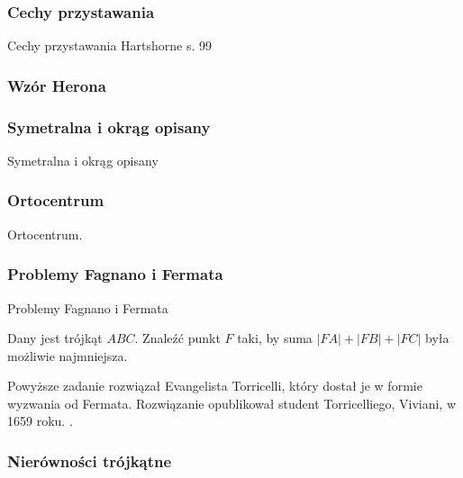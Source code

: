 
\subsubsection{Cechy przystawania}
Cechy przystawania
\loremipsum
Hartshorne s. 99







\subsubsection{Wzór Herona}


\subsubsection{Symetralna i okrąg opisany}
Symetralna i okrąg opisany
\loremipsum

\subsubsection{Ortocentrum}
Ortocentrum.
\loremipsum

\subsubsection{Problemy Fagnano i Fermata}
Problemy Fagnano i Fermata

\begin{problem}
	Dany jest trójkąt $ABC$.
	Znaleźć punkt $F$ taki, by suma $|FA| + |FB| + |FC|$ była możliwie najmniejsza.
\end{problem}

Powyższe zadanie rozwiązał Evangelista Torricelli, który dostał je w formie wyzwania od Fermata.
Rozwiązanie opublikował student Torricelliego, Viviani, w 1659 roku.
. %

\subsubsection{Nierówności trójkątne}


